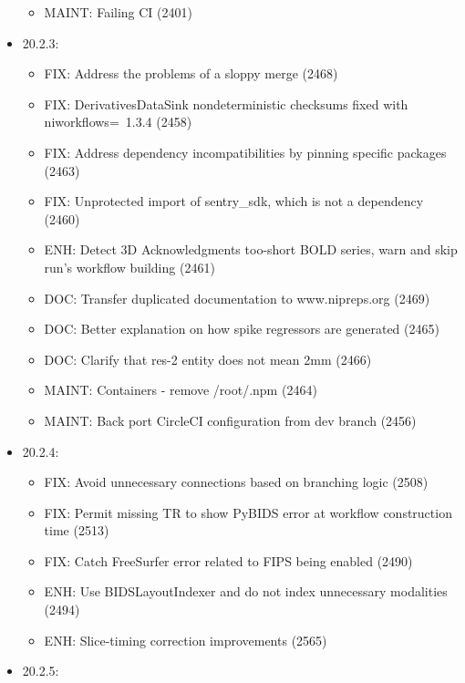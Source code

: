 \documentclass{article}
\begin{document}
\begin{appendices}
\begin{itemize}
\begin{itemize}
                  \item MAINT: Failing CI (2401)
              \end{itemize}
        \item 20.2.3:
              \begin{itemize}
                  \item FIX: Address the problems of a sloppy merge (2468)
                  \item FIX: DerivativesDataSink nondeterministic checksums fixed with niworkflows=~1.3.4 (2458)
                  \item FIX: Address dependency incompatibilities by pinning specific packages (2463)
                  \item FIX: Unprotected import of sentry\_sdk, which is not a dependency (2460)
                  \item ENH: Detect 3D Acknowledgments too-short BOLD series, warn and skip run's workflow building (2461)
                  \item DOC: Transfer duplicated documentation to www.nipreps.org (2469)
                  \item DOC: Better explanation on how spike regressors are generated (2465)
                  \item DOC: Clarify that res-2 entity does not mean 2mm (2466)
                  \item MAINT: Containers - remove /root/.npm (2464)
                  \item MAINT: Back port CircleCI configuration from dev branch (2456)
              \end{itemize}
        \item 20.2.4:
              \begin{itemize}
                  \item FIX: Avoid unnecessary connections based on branching logic (2508)
                  \item FIX: Permit missing TR to show PyBIDS error at workflow construction time (2513)
                  \item FIX: Catch FreeSurfer error related to FIPS being enabled (2490)
                  \item ENH: Use BIDSLayoutIndexer and do not index unnecessary modalities (2494)
                  \item ENH: Slice-timing correction improvements (2565)
              \end{itemize}
        \item 20.2.5:

\end{itemize}
\end{appendices}
\end{document}
